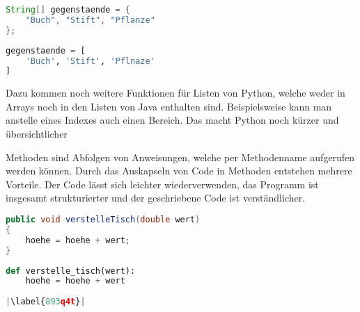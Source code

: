 \begin{minipage}{.5\linewidth}
\begin{lstlisting}[language=java,caption={Einfache Deklarierung Java},captionpos=b,label={lst:java:ezarray},frame=none]
String[] gegenstaende = {
    "Buch", "Stift", "Pflanze"
};
\end{lstlisting}
\end{minipage}
\begin{minipage}{.5\linewidth}
\begin{lstlisting}[language=python,caption={Einfach Deklarierung Python},captionpos=b,label={lst:python:ezarray},frame=l]
gegenstaende = [
    'Buch', 'Stift', 'Pflnaze'
]
\end{lstlisting}
\end{minipage}

Dazu kommen noch weitere Funktionen für Listen von Python, welche weder in Arrays noch in den Listen von Java enthalten sind. Beispielsweise kann man anstelle eines Indexes auch einen Bereich. Das macht Python noch kürzer und übersichtlicher\par
Methoden sind Abfolgen von Anweisungen, welche per Methodenname aufgerufen werden können. Durch das Auskapseln von Code in Methoden entstehen mehrere Vorteile. Der Code lässt sich leichter wiederverwenden, das Programm ist insgesamt strukturierter und der geschriebene Code ist verständlicher. \cite{Python3:Buch}\cite{Louis:2010}

\begin{minipage}{.5\linewidth}
\begin{lstlisting}[language=java,caption={Methoden in Java},captionpos=b,label={lst:java:methode},frame=none]
public void verstelleTisch(double wert)
{
    hoehe = hoehe + wert;
}
\end{lstlisting}
\end{minipage}
\begin{minipage}{.5\linewidth}
\begin{lstlisting}[language=python,caption={Methode in Python},captionpos=b,label={lst:python:methode},frame=l,escapechar=|]
def verstelle_tisch(wert):
    hoehe = hoehe + wert
    
|\label{893q4t}|
\end{lstlisting}
\end{minipage}

